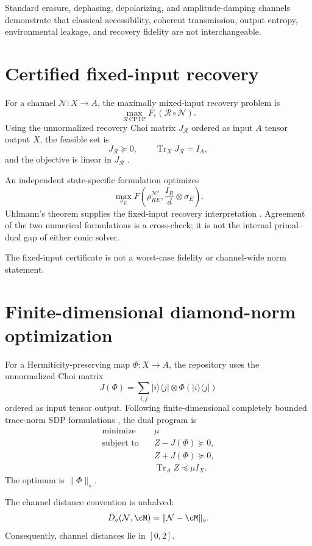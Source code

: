 \documentclass[11pt]{article}
\newcommand{\cN}{\mathcal N}
\newcommand{\cR}{\mathcal R}
\newcommand{\Tr}{\operatorname{Tr}}
\begin{document}
Standard erasure, dephasing, depolarizing, and amplitude-damping channels demonstrate that classical accessibility, coherent transmission, output entropy, environmental leakage, and recovery fidelity are not interchangeable.

\section{Certified fixed-input recovery}
\label{sec:fixed}

For a channel $\cN:X\rightarrow A$, the maximally mixed-input recovery problem is
\[
\max_{\cR\,\mathrm{CPTP}}F_e(\cR\circ\cN).
\]
Using the unnormalized recovery Choi matrix $J_{\cR}$ ordered as input $A$ tensor output $X$, the feasible set is
\[
J_{\cR}\succeq0,
\qquad
\Tr_XJ_{\cR}=I_A,
\]
and the objective is linear in $J_{\cR}$ \citep{FletcherShorWin2006}.

An independent state-specific formulation optimizes
\[
\max_{\sigma_E}
F\!\left(\rho_{RE}^{\cN^c},\frac{I_R}{d}\otimes\sigma_E\right).
\]
Uhlmann's theorem supplies the fixed-input recovery interpretation \citep{Uhlmann1976}. Agreement of the two numerical formulations is a cross-check; it is not the internal primal--dual gap of either conic solver.

The fixed-input certificate is not a worst-case fidelity or channel-wide norm statement.

\section{Finite-dimensional diamond-norm optimization}
\label{sec:diamond}

For a Hermiticity-preserving map $\Phi:X\rightarrow A$, the repository uses the unnormalized Choi matrix
\[
J(\Phi)=\sum_{i,j}|i\rangle\langle j|\otimes\Phi(|i\rangle\langle j|)
\]
ordered as input tensor output. Following finite-dimensional completely bounded trace-norm SDP formulations \citep{Watrous2009,Watrous2012}, the dual program is
\[
\begin{aligned}
\text{minimize}\quad & \mu\\
\text{subject to}\quad
& Z-J(\Phi)\succeq0,\\
& Z+J(\Phi)\succeq0,\\
& \Tr_AZ\preceq\mu I_X.
\end{aligned}
\]
The optimum is $\|\Phi\|_\diamond$.

The channel distance convention is unhalved:
\[
D_\diamond(\cN,\cM)=\|\cN-\cM\|_\diamond.
\]
Consequently, channel distances lie in $[0,2]$.
\end{document}
